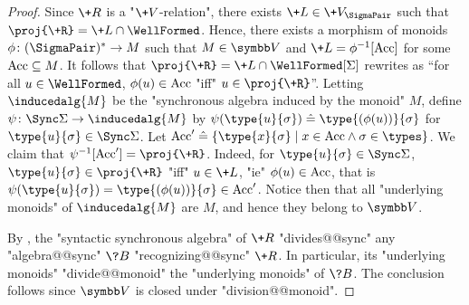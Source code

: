 \begin{proof}
	 Since $\+R$ is a "$\+V$-relation", there exists
	$\+L \in \+V_{\SigmaPair}$ such that $\proj{\+R} = \+L \cap \WellFormed$.
	Hence, there exists a morphism of monoids $\phi\colon (\SigmaPair)^* \to M$ such 
	that $M \in \B{V}$ and $\+L = \phi^{-1}[\Acc]$ for some $\textrm{Acc} \subseteq M$.
	It follows that $\proj{\+R} = \+L \cap \WellFormed[\Sigma]$ rewrites as
	``for all $u \in \WellFormed$, $\phi(u) \in \textrm{Acc}$ "iff" $u \in \proj{\+R}$''.
	Letting $\inducedalg{M}$ be the "synchronous algebra induced by the monoid" $M$, define
	$\psi\colon \Sync\Sigma \to \inducedalg{M}$ by $\psi(\type{u}{\sigma}) \defeq
	\type{(\phi(u))}{\sigma}$ for $\type{u}{\sigma} \in \Sync\Sigma$.
	Let $\Acc' \defeq \{\type{x}{\sigma} \mid x \in \Acc \land \sigma \in \types\}$.
	We claim that $\psi^{-1}[\Acc'] = \proj{\+R}$. Indeed, for $\type{u}{\sigma} \in \Sync\Sigma$,
	$\type{u}{\sigma} \in \proj{\+R}$ "iff" $u \in \+L$,
	"ie" $\phi(u) \in \textrm{Acc}$,
	that is $\psi(\type{u}{\sigma}) = \type{(\phi(u))}{\sigma} \in \Acc'$.
	Notice then that all "underlying monoids" of $\inducedalg{M}$ are $M$,
	and hence they belong to $\B{V}$.

	 By , 
	the "syntactic synchronous algebra" of $\+R$ "divides@@sync"
	any "algebra@@sync" $\?B$ "recognizing@@sync" $\+R$.
	In particular, its "underlying monoids" "divide@@monoid" the "underlying monoids" of $\?B$. The conclusion follows since $\B{V}$ is closed under "division@@monoid". 
	

\end{proof}
